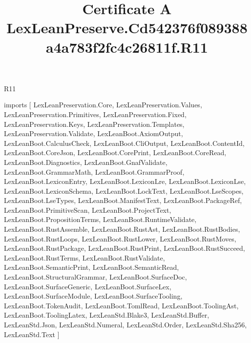 \begin{lexlean}{R11}
\title{Certificate A LexLeanPreserve.Cd542376f089388a4a783f2fc4c26811f.R11}
\begin{coremodule}
imports [
  LexLeanPreservation.Core,
  LexLeanPreservation.Values,
  LexLeanPreservation.Primitives,
  LexLeanPreservation.Fixed,
  LexLeanPreservation.Keys,
  LexLeanPreservation.Templates,
  LexLeanPreservation.Validate,
  LexLeanBoot.AxiomOutput,
  LexLeanBoot.CalculusCheck,
  LexLeanBoot.CliOutput,
  LexLeanBoot.ContentId,
  LexLeanBoot.CoreJson,
  LexLeanBoot.CorePrint,
  LexLeanBoot.CoreRead,
  LexLeanBoot.Diagnostics,
  LexLeanBoot.GnafValidate,
  LexLeanBoot.GrammarMath,
  LexLeanBoot.GrammarProof,
  LexLeanBoot.LexiconEntry,
  LexLeanBoot.LexiconLre,
  LexLeanBoot.LexiconLse,
  LexLeanBoot.LexiconSchema,
  LexLeanBoot.LockText,
  LexLeanBoot.LseScopes,
  LexLeanBoot.LseTypes,
  LexLeanBoot.ManifestText,
  LexLeanBoot.PackageRef,
  LexLeanBoot.PrimitiveScan,
  LexLeanBoot.ProjectText,
  LexLeanBoot.PropositionTerms,
  LexLeanBoot.RuntimeValidate,
  LexLeanBoot.RustAssemble,
  LexLeanBoot.RustAst,
  LexLeanBoot.RustBodies,
  LexLeanBoot.RustLoops,
  LexLeanBoot.RustLower,
  LexLeanBoot.RustMoves,
  LexLeanBoot.RustPackage,
  LexLeanBoot.RustPrint,
  LexLeanBoot.RustSucceed,
  LexLeanBoot.RustTerms,
  LexLeanBoot.RustValidate,
  LexLeanBoot.SemanticPrint,
  LexLeanBoot.SemanticRead,
  LexLeanBoot.StructuralGrammar,
  LexLeanBoot.SurfaceDoc,
  LexLeanBoot.SurfaceGeneric,
  LexLeanBoot.SurfaceLex,
  LexLeanBoot.SurfaceModule,
  LexLeanBoot.SurfaceTooling,
  LexLeanBoot.TokenAudit,
  LexLeanBoot.TomlRead,
  LexLeanBoot.ToolingAst,
  LexLeanBoot.ToolingLatex,
  LexLeanStd.Blake3,
  LexLeanStd.Buffer,
  LexLeanStd.Json,
  LexLeanStd.Numeral,
  LexLeanStd.Order,
  LexLeanStd.Sha256,
  LexLeanStd.Text
]


\end{coremodule}
\end{lexlean}
